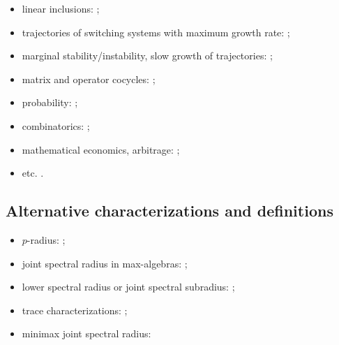 \documentclass[a4paper,fleqn]{article}
\let\cite=\citep
\begin{document}
\begin{itemize}
\item linear inclusions: \cite{ABMW:MTNS12, AJPR:IFACSRCD12, Bar:AIT88-3:e, Bar:AIT88-2:e, Bar:AIT88-5:e, Bar:ACC95, BarVin:LAA11, CheMam:BASRM04, DaiOp:AIT01:e, DHHX:JFI17, GurSam:CDC05, Gurv:LAA95, VEB:LAA00, Wirth:IJRNC98};
\item trajectories of switching systems with maximum growth rate: \cite{ACDDHK:STACS15, BCH:SF16, GCM:CDC13, CGM:JDE15, GS:CDC17, HSZ:IEEETAC09, Koz:CDC05:e, Koz:Automatica22, Koz:WIAS05, Koz:INFOPROC06:e, LJP:HSCC16, MonMarg:AJIFAC11, Morris:ArXiv23-2, ShenHu:SIAMJCO12, WuHe:SIAMJCO20};
\item marginal stability/instability, slow growth of trajectories: \cite{CMS:SCL12, Morris:SCL22, Morris:ArXiv23-2, Sun:IEEETAC08, PhilJung:ICHS15, PJ:NAHS15, Prot:SCL16, Varney21, VarMor:ArXiv22};
\item matrix and operator cocycles: \cite{BD:StochDyn21, DHX:ArXiv13-1, Morris:JFA12};
\item probability: \cite{ADFP:93, AltPar:CDC19, AltPar:SIAMJCO20, DHH:ArXiv14, KKV:CESA98, Li:IEEETAC11, Sert:Thesis16, Sert:CRMASP17};
\item combinatorics: \cite{BJ:CANT10, JPB:TCM09, MOS:GTS99, MOS:IEEETIT01, MOS:LAA07, Prot:SM00};
\item mathematical economics, arbitrage: \cite{CrossKPP:MECA12, CrossKoz:DCDSB13, KozCalPok:ArXiv10};
\item etc. \cite{BCK:AIP16, JPB:LNCS08, NP:SIAMJMAA20, Oreg-Reyes:GGD18, TO:ArXiv09, VladRub:JCA01}.
\end{itemize}

\subsection*{Alternative characterizations and definitions}
\begin{itemize}
\item $p$-radius: \cite{BhaBha:SM95, JP:CDC10, JunProt:SIAMJSC11, Morris:SIAMJMAA22, OgurJung:CDC14, OgurMart:LAA14, OPJ:SCL16, Prot:LAA08, Prot:CDC05-2, Muller:APM97, Morris:AM16};
\item joint spectral radius in max-algebras: \cite{Bapat:LAA98, BGT:IEEETAC00, DGM:LIPICS17, Gaubert:IEEETAC95, GMW:LAA17, GurMas:LAA11, Lur:LAA05, Lur:LAA06-1, LurYang:LAA09, MulPep:LAA13, Pep:LAA08, Pep:LAA11};
\item lower spectral radius or joint spectral subradius: \cite{BochiMor:PLMS15, CJ:IJAMCS06, CJ:IJAMCS07, Czornik:LAA05, DekKui:JEMS11, JPB:TCM09, Jungers:LAA12};
\item trace characterizations: \cite{ChenZhou:LAA00, Xu:EJLA10};
\item minimax joint spectral radius: \cite{Koz:DCDSB19}
\end{itemize}
\end{document}
